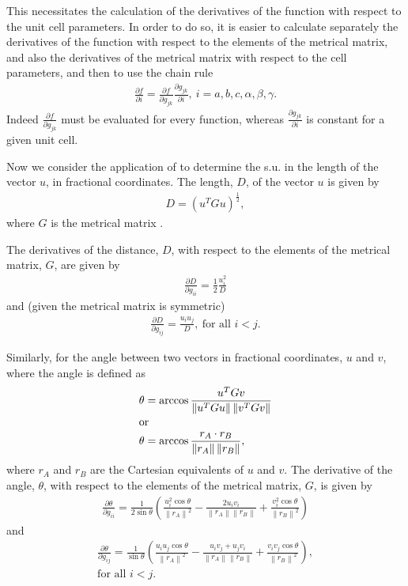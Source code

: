 \documentclass[11pt]{article}
\newcommand{\mat}[1]{#1}
\newcommand{\norm}[1]{\left\| #1 \right\|}
\newcommand{\partialder}[2]{\frac{\partial #1}{\partial #2}}
\begin{document}
This necessitates the calculation of the derivatives of the function with respect to the unit cell parameters. In order to do so, it is easier to calculate separately the derivatives of the function with respect to the elements of the metrical matrix, and also the derivatives of the metrical matrix with respect to the cell parameters, and then to use the chain rule
\begin{align}
\partialder{f}{i} = \partialder{f}{g_{jk}}\partialder{g_{jk}}{i},\ i=a, b, c, \alpha, \beta, \gamma.
\label{eqn:df_dcell}
\end{align}
Indeed $\partialder{f}{g_{jk}}$ must be evaluated for every function, whereas $\partialder{g_{jk}}{i}$ is constant for a given unit cell.

Now we consider the application of  to determine the s.u. in the length of the vector $u$, in fractional coordinates. The length, $D$, of the  vector $u$ is given by
\begin{align}
D = (u^T \mat{G} u)^\frac{1}{2}
\label{eqn:bond_length},
\end{align}
where $\mat{G}$ is the metrical matrix \textbookref.

The derivatives of the distance, $D$, with respect to the elements of the metrical matrix, $\mat{G}$, are given by
\begin{align}
\partialder{D}{g_{ii}} = \frac{1}{2} \frac{u_i^2}{D}
\label{eqn:d_distance_d_gii}
\end{align}
and (given the metrical matrix is symmetric)
\begin{align}
\partialder{D}{g_{ij}} = \frac{u_i u_j}{D},\ \text{for all $i<j$}.
\label{eqn:d_distance_d_gij}
\end{align}

Similarly, for the angle between two vectors in fractional coordinates, $u$ and $v$, where the angle is defined as
\begin{align}
\theta &= \arccos \frac{u^T\mat{G}v}{\norm{u^T\mat{G}u}\norm{v^T\mat{G}v}} \\
\intertext{or}
\theta &= \arccos \frac{r_{A}\cdot r_{B}}{\norm{r_{A}}\norm{r_{B}}}
\label{eqn:angle_cart},
\end{align}
where $r_{A}$ and $r_{B}$ are the Cartesian equivalents of $u$ and $v$. The derivative of the angle, $\theta$, with respect to the elements of the metrical matrix, $\mat{G}$, is given by
\begin{align}
\partialder{\theta}{g_{ii}} = \frac{1}{2 \sin\theta} \left(\frac{u_i^2 \cos{\theta}}{\norm{r_{A}}^2} - \frac{2 u_i v_i }{\norm{r_{A}}\norm{r_{B}}} +\frac{v_i^2 \cos{\theta}}{\norm{r_{B}}^2}\right)
\label{eqn:d_angle_d_gii}
\end{align}
and
\begin{multline}
\partialder{\theta}{g_{ij}} = \frac{1}{\sin\theta} \left(\frac{u_i u_j \cos{\theta}}{\norm{r_{A}}^2} - \frac{u_i v_j + u_j v_i }{\norm{r_{A}}\norm{r_{B}}} +\frac{v_i v_j \cos{\theta}}{\norm{r_{B}}^2}\right),\\ \text{for all $i<j$}.
\label{eqn:d_angle_d_gij}
\end{multline}
\end{document}

